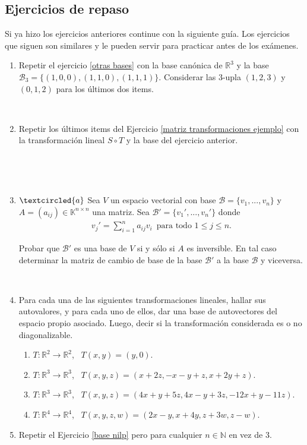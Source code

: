 \documentclass[12pt]{amsart}
\begin{document}
\subsection*{Ejercicios de repaso}
Si ya hizo los ejercicios anteriores continue con la siguiente gu\'ia. Los ejercicios que siguen son similares y le pueden servir para practicar antes de los ex\'amenes.

\begin{enumerate}[resume, topsep=5pt,itemsep=5pt]
 \item\label{otras bases 3} Repetir el ejercicio \eqref{otras bases} con la base can\'onica de $\mathbb{R}^3$ y la base $\mathcal{B}_3=\{(1,0,0),(1,1,0),(1,1,1)\}$. Considerar las $3$-upla $(1,2,3)$ y $(0,1,2)$ para los \'ultimos dos items.
 
 \
 
 \item Repetir los \'ultimos items del Ejercicio \eqref{matriz transformaciones ejemplo} con la transformaci\'on lineal $S\circ T$ y la base del ejercicio anterior.

 \
 
 \
 
 \item\label{cambio de base} $\textcircled{a}$ Sea $V$ un espacio vectorial con base $\mathcal{B}=\{v_1, ..., v_n\}$ y $A=(a_{ij})\in\mathbb{K}^{n\times n}$ una matriz. Sea $\mathcal{B}'=\{v_1', ..., v_n'\}$ donde
\begin{align*}
v_j'=\sum_{i=1}^na_{ij}v_i\,\mbox{ para todo $1\leq j\leq n$}. 
\end{align*}

Probar que $\mathcal{B}'$ es una base de $V$ si y s\'olo si $A$ es inversible. En tal caso determinar la matriz de cambio de base de la base $\mathcal{B}'$ a la base $\mathcal{B}$ y viceversa.

\


	    \item Para cada una de las siguientes transformaciones lineales, hallar sus autovalores,
	y para cada uno de ellos, dar una base de autovectores del espacio propio asociado. Luego, decir si la
	transformaci\'on considerada es o no  diagonalizable.
	\begin{enumerate}
		\item $T:\mathbb{R}^2\to \mathbb{R}^2$, \ $T(x,y)=(y,0)$.
		\item $T:\mathbb{R}^3\to \mathbb{R}^3$, \ $T(x,y,z)=(x+2z,-x-y+z,x+2y+z)$.
		\item $T:\mathbb{R}^3\to \mathbb{R}^3$, \ $T(x,y,z)=(4x+y+5z,4x-y+3z,-12x+y-11z)$.
        \item $T:\mathbb{R}^4\to \mathbb{R}^4$, \ $T(x,y,z,w)=(2x-y,x+4y,z+3w,z-w)$.
	\end{enumerate}

 \item Repetir el Ejercicio \eqref{base nilp}  pero para cualquier $n\in\mathbb{N}$ en vez de $3$.

\end{enumerate}
\end{document}
